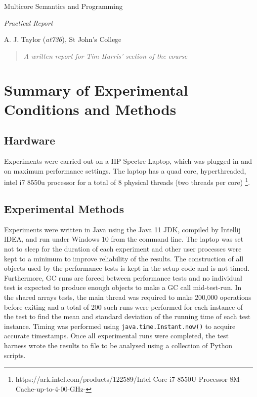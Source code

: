 \documentclass[11pt]{article}
\begin{document}
\centerline{\Large Multicore Semantics and Programming}
\vspace{2em}
\centerline{\Large \emph{Practical Report}}
\vspace{2em}
\centerline{\large A. J. Taylor (\emph{at736}), St John's College}
\vspace{1em}

\begin{abstract}
\textsl{
	A written report for Tim Harris' section of the course
} 
\end{abstract}




\section{Summary of Experimental Conditions and Methods}

\subsection{Hardware}
Experiments were carried out on a HP Spectre Laptop, which was plugged in and on maximum performance settings. The laptop has a quad core, hyperthreaded, intel i7 8550u processor for a total of 8 physical threads (two threads per core) \footnote{https://ark.intel.com/products/122589/Intel-Core-i7-8550U-Processor-8M-Cache-up-to-4-00-GHz-}.

\subsection{Experimental Methods}
Experiments were written in Java using the Java 11 JDK, compiled by Intellij IDEA, and run under Windows 10 from the command line. The laptop was set not to sleep for the duration of each experiment and other user processes were kept to a minimum to improve reliability of the results. The construction of all objects used by the performance tests is kept in the setup code and is not timed. Furthermore, GC runs are forced between performance tests and no individual test is expected to produce enough objects to make a GC call mid-test-run. In the shared arrays tests, the main thread was required to make 200,000 operations before exiting and a total of 200 such runs were performed for each instance of the test to find the mean and standard deviation of the running time of each test instance. Timing was performed using \texttt{java.time.Instant.now()} to acquire accurate timestamps. Once all experimental runs were completed, the test harness wrote the results to file to be analysed using a collection of Python scripts.
\end{document}
